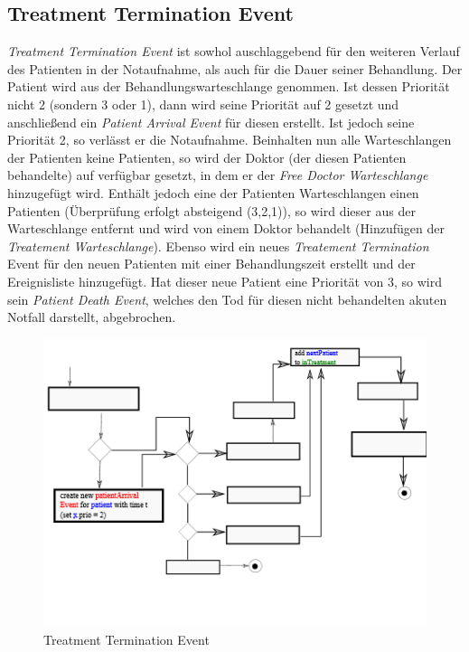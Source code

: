 \documentclass[12pt,fleqn,a4paper]{article}
\begin{document}
\subsection{Treatment Termination Event}
\textit{Treatment Termination Event} ist sowhol auschlaggebend f\"{u}r den weiteren Verlauf des Patienten in der Notaufnahme, als auch f\"{u}r die Dauer seiner Behandlung. Der Patient wird aus der Behandlungswarteschlange genommen. Ist dessen Priorit\"{a}t nicht 2 (sondern 3 oder 1), dann wird seine Priorit\"{a}t auf 2 gesetzt und anschlie\ss end ein \textit{Patient Arrival Event} f\"{u}r diesen erstellt. Ist jedoch seine Priorit\"{a}t 2, so verl\"{a}sst er die Notaufnahme.
Beinhalten nun alle Warteschlangen der Patienten keine Patienten, so wird der Doktor (der diesen Patienten behandelte) auf verf\"{u}gbar gesetzt, in dem er der \textit{Free Doctor Warteschlange} hinzugef\"{u}gt wird. Enth\"{a}lt jedoch eine der Patienten Warteschlangen einen Patienten (\"{U}berpr\"{u}fung erfolgt absteigend (3,2,1)),  so wird dieser aus der Warteschlange entfernt und wird von einem Doktor behandelt (Hinzuf\"{u}gen der \textit{Treatement Warteschlange}). Ebenso wird ein neues \textit{Treatement Termination} Event f\"{u}r den neuen Patienten mit einer Behandlungszeit erstellt und der Ereignisliste hinzugef\"{u}gt.
Hat dieser neue Patient eine Priorit\"{a}t von 3, so wird sein \textit{Patient Death Event}, welches den Tod f\"{u}r diesen nicht behandelten akuten Notfall darstellt, abgebrochen.

\begin{figure}[h]
	\centering
	\includegraphics{img/TreatmentTermination}
	\caption{Treatment Termination Event}
\end{figure}
\end{document}
